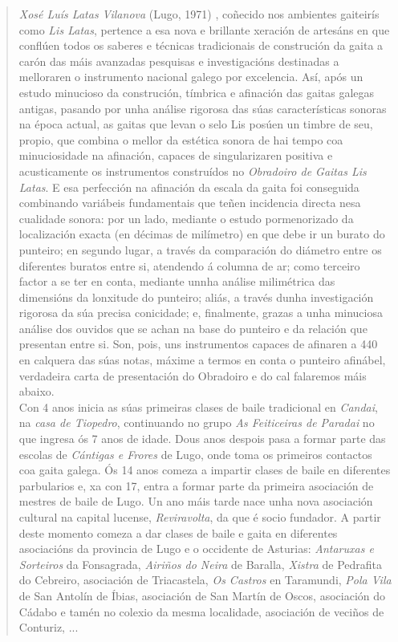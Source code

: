   \begin{quotation}
  \slshape

   \textit{Xosé Luís Latas Vilanova} (Lugo, 1971) \cite{LisLatas}, coñecido nos
   ambientes gaiteirís como \textit{Lis Latas}, pertence a esa nova e brillante
   xeración de artesáns en que conflúen todos os saberes e técnicas
   tradicionais de construción da gaita a carón das máis avanzadas pesquisas e
   investigacións destinadas a melloraren o instrumento nacional galego por
   excelencia. Así, após un estudo minucioso da construción, tímbrica e
   afinación das gaitas galegas antigas, pasando por unha análise rigorosa das
   súas características sonoras na época actual, as gaitas que levan o selo Lis
   posúen un timbre de seu, propio, que combina o mellor da estética sonora de
   hai tempo coa minuciosidade na afinación, capaces de singularizaren positiva
   e acusticamente os instrumentos construídos no
   \textit{Obradoiro de Gaitas Lis Latas}. E esa perfección na afinación da
   escala da gaita foi conseguida combinando variábeis fundamentais que teñen
   incidencia directa nesa cualidade sonora: por un lado, mediante o estudo
   pormenorizado da localización exacta (en décimas de milímetro) en que debe
   ir un burato do punteiro; en segundo lugar, a través da comparación do
   diámetro entre os diferentes buratos entre si, atendendo á columna de ar;
   como terceiro factor a se ter en conta, mediante unnha análise milimétrica
   das dimensións da lonxitude do punteiro; aliás, a través dunha investigación
   rigorosa da súa precisa conicidade; e, finalmente, grazas a unha minuciosa
   análise dos ouvidos que se achan na base do punteiro e da relación que
   presentan entre si. Son, pois, uns instrumentos capaces de afinaren a 440 en
   calquera das súas notas, máxime a termos en conta o punteiro afinábel,
   verdadeira carta de presentación do Obradoiro e do cal falaremos máis
   abaixo. \\

   Con 4 anos inicia as súas primeiras clases de baile tradicional en
   \textit{Candai}, na \textit{casa de Tiopedro}, continuando no grupo
   \textit{As Feiticeiras de Paradai} no que ingresa ós 7 anos de idade. Dous
   anos despois pasa a formar parte das escolas de \textit{Cántigas e Frores}
   de Lugo, onde toma os primeiros contactos coa gaita galega. Ós 14 anos
   comeza a impartir clases de baile en diferentes parbularios e, xa con 17,
   entra a formar parte da primeira asociación de mestres de baile de Lugo. Un
   ano máis tarde nace unha nova asociación cultural na capital lucense,
   \textit{Reviravolta}, da que é socio fundador. A partir deste momento comeza
   a dar clases de baile e gaita en diferentes asociacións da provincia de Lugo
   e o occidente de Asturias: \textit{Antaruxas e Sorteiros} da Fonsagrada,
   \textit{Airiños do Neira} de Baralla, \textit{Xistra} de Pedrafita do
   Cebreiro, asociación de Triacastela, \textit{Os Castros} en Taramundi,
   \textit{Pola Vila} de San Antolín de Íbias, asociación de San Martín de
   Oscos, asociación do Cádabo e tamén no colexio da mesma localidade,
   asociación de veciños de Conturiz, ... \\


\end{quotation}

